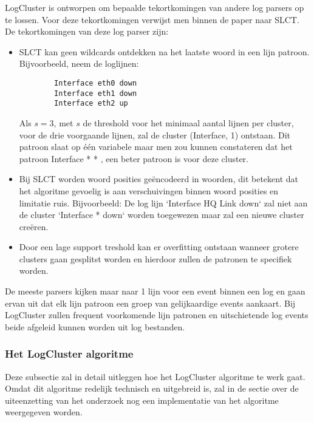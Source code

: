 LogCluster is ontworpen om bepaalde tekortkomingen van andere log parsers op te lossen. Voor deze tekortkomingen verwijst men binnen de paper naar SLCT. De tekortkomingen van deze log parser zijn:
\begin{itemize}
    \item SLCT kan geen wildcards ontdekken na het laatste woord in een lijn patroon. Bijvoorbeeld, neem de loglijnen:
    
    \begin{verbatim}
        Interface eth0 down
        Interface eth1 down
        Interface eth2 up 
    \end{verbatim}

    Als $s = 3$, met $s$ de threshold voor het minimaal aantal lijnen per cluster, voor de drie voorgaande lijnen, zal de cluster {(Interface, 1)} ontstaan. Dit patroon slaat op één variabele maar men zou kunnen constateren dat het patroon Interface * * , een beter patroon is voor deze cluster.\\
    
    \item Bij SLCT worden woord posities geëncodeerd in woorden, dit betekent dat het algoritme gevoelig is aan verschuivingen binnen woord posities en limitatie ruis. Bijvoorbeeld: De log lijn `Interface HQ Link down` zal niet aan de cluster `Interface * down` worden toegewezen maar zal een nieuwe cluster creëren.\\
    
    \item Door een lage support treshold kan er overfitting ontstaan wanneer grotere clusters gaan gesplitst worden en hierdoor zullen de patronen te specifiek worden.
\end{itemize} 
De meeste parsers kijken maar naar 1 lijn voor een event binnen een log en gaan ervan uit dat elk lijn patroon een groep van gelijkaardige events aankaart. Bij LogCluster zullen frequent voorkomende lijn patronen en uitschietende log events beide afgeleid kunnen worden uit log bestanden. 

\subsubsection{Het LogCluster algoritme}
Deze subsectie zal in detail uitleggen hoe het LogCluster algoritme te werk gaat. Omdat dit algoritme redelijk technisch en uitgebreid is, zal in de sectie over de uiteenzetting van het onderzoek nog een implementatie van het algoritme weergegeven worden.

